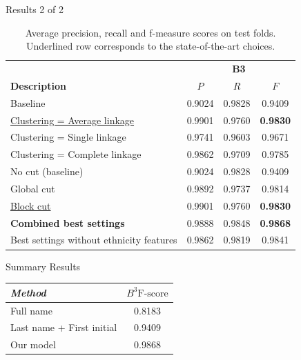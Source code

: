 \documentclass{beamer}
\begin{document}

\begin{frame}{Results 2 of 2}

\begin{table}
\caption{Average precision, recall and f-measure scores on test folds. Underlined row corresponds to the state-of-the-art choices.}
\centering
\begin{tabular}{|l|c c c |}
  \hline
                       & \multicolumn{3}{|c|}{\textbf{B3}}\\
  \textbf{Description} & $P$ & $R$ & $F$ \\
  \hline
  \hline
Baseline & 0.9024 & 0.9828 & 0.9409  \\
\hline
\underline{Clustering = Average linkage} & 0.9901 & 0.9760 & \textbf{0.9830}  \\
Clustering = Single linkage & 0.9741 & 0.9603 & 0.9671  \\
Clustering = Complete linkage & 0.9862 & 0.9709 & 0.9785   \\
\hline
No cut (baseline) & 0.9024 & 0.9828 & 0.9409   \\
Global cut & 0.9892 & 0.9737 & 0.9814   \\
\underline{Block cut} & 0.9901 & 0.9760 & \textbf{0.9830} \\
\hline
\textbf{Combined best settings} & 0.9888 & 0.9848 & \textbf{0.9868}  \\
Best settings without ethnicity features & 0.9862 & 0.9819 & 0.9841 \\
\hline

\end{tabular}
\end{table}

\end{frame}


\begin{frame}{Summary Results}

\begin{table}
    \centering
    \begin{tabular}{| l c |}
    \hline
        \textit{Method} & \textit{$B^3 \text{F-score}$}  \\
    \hline
    \hline
    Full name & 0.8183 \\
    Last name + First initial & 0.9409 \\
    \hline
    Our model & {\color{blue} 0.9868} \\
    \hline
    \end{tabular}
\end{table}

\end{frame}
\end{document}
